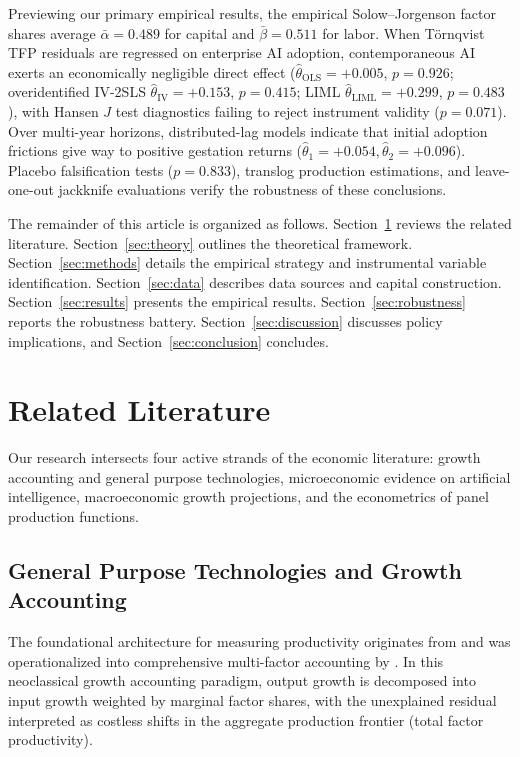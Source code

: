 \documentclass[11pt,a4paper]{article}
\begin{document}
Previewing our primary empirical results, the empirical Solow--Jorgenson factor shares average $\bar{\alpha} = 0.489$ for capital and $\bar{\beta} = 0.511$ for labor. When Törnqvist TFP residuals are regressed on enterprise AI adoption, contemporaneous AI exerts an economically negligible direct effect ($\hat{\theta}_{\text{OLS}} = +0.005$, $p = 0.926$; overidentified IV-2SLS $\hat{\theta}_{\text{IV}} = +0.153$, $p = 0.415$; LIML $\hat{\theta}_{\text{LIML}} = +0.299$, $p = 0.483$), with Hansen $J$ test diagnostics failing to reject instrument validity ($p = 0.071$). Over multi-year horizons, distributed-lag models indicate that initial adoption frictions give way to positive gestation returns ($\hat{\theta}_1 = +0.054, \hat{\theta}_2 = +0.096$). Placebo falsification tests ($p = 0.833$), translog production estimations, and leave-one-out jackknife evaluations verify the robustness of these conclusions.

The remainder of this article is organized as follows. Section~\ref{sec:lit} reviews the related literature. Section~\ref{sec:theory} outlines the theoretical framework. Section~\ref{sec:methods} details the empirical strategy and instrumental variable identification. Section~\ref{sec:data} describes data sources and capital construction. Section~\ref{sec:results} presents the empirical results. Section~\ref{sec:robustness} reports the robustness battery. Section~\ref{sec:discussion} discusses policy implications, and Section~\ref{sec:conclusion} concludes.

\section{Related Literature}
\label{sec:lit}

Our research intersects four active strands of the economic literature: growth accounting and general purpose technologies, microeconomic evidence on artificial intelligence, macroeconomic growth projections, and the econometrics of panel production functions.

\subsection{General Purpose Technologies and Growth Accounting}
The foundational architecture for measuring productivity originates from \citet{solow1957} and was operationalized into comprehensive multi-factor accounting by \citet{jorgenson1967}. In this neoclassical growth accounting paradigm, output growth is decomposed into input growth weighted by marginal factor shares, with the unexplained residual interpreted as costless shifts in the aggregate production frontier (total factor productivity). 
\end{document}
